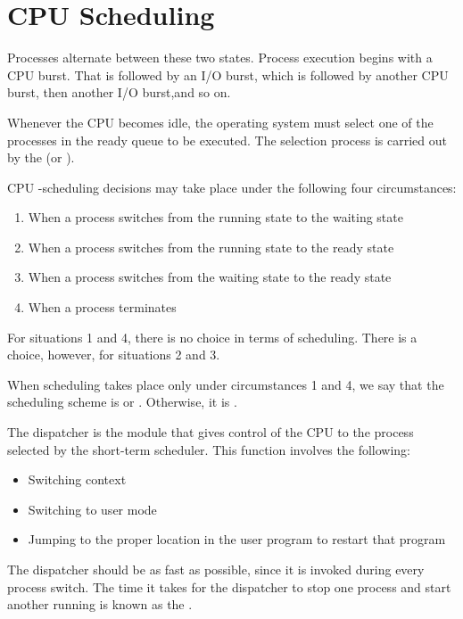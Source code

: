 \chapter{CPU Scheduling}

     \par Processes alternate between these two states. Process execution begins with a CPU burst. That is followed by an I/O burst, which is followed by another CPU burst, then another I/O burst,and so on.

    \par Whenever the CPU becomes idle, the operating system must select one of the processes in the ready queue to be executed. The selection process is carried out by the  (or ).

    \par CPU -scheduling decisions may take place under the following four circumstances:
    \begin{enumerate}[1.]
      \item When a process switches from the running state to the waiting state
      \item When a process switches from the running state to the ready state
      \item When a process switches from the waiting state to the ready state
      \item When a process terminates
    \end{enumerate}

    \par For situations 1 and 4, there is no choice in terms of scheduling.  There is a choice, however, for situations 2 and 3.
    \par When scheduling takes place only under circumstances 1 and 4, we say that the scheduling scheme is  or . Otherwise, it is .

    \par The dispatcher is the module that gives control of the CPU to the process selected by the short-term scheduler. This function involves the following:
    \begin{itemize}
      \item Switching context
      \item Switching to user mode
      \item Jumping to the proper location in the user program to restart that program
    \end{itemize}
    \par The dispatcher should be as fast as possible, since it is invoked during every process switch. The time it takes for the dispatcher to stop one process and start another running is known as the .

